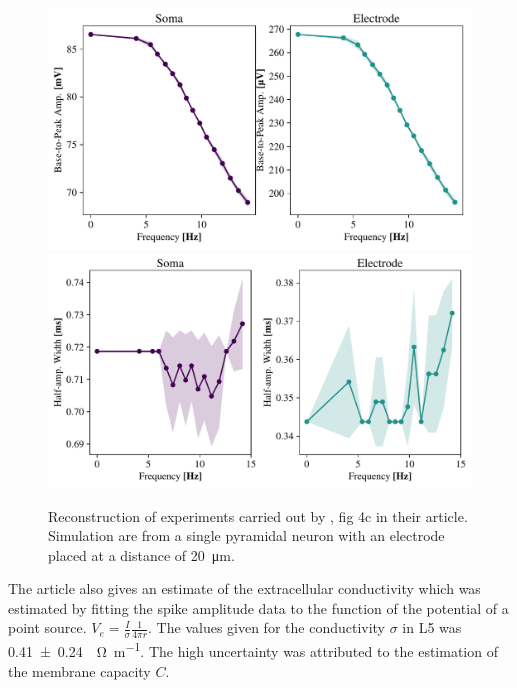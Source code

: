 \documentclass[altfont, fleqn]{uiophd}
\begin{document}
\begin{figure}[h]
    \begin{center}
        \includegraphics[width=\linewidth]{images/sec_4/freq_amp_soma_elec.pdf}
        \includegraphics[width=\linewidth]{images/sec_4/freq_width_soma_elec.pdf}
        \caption{
            Reconstruction of experiments carried out by 
            \textcite{anastassiou_cell_2015}, 
            fig 4c in their article. 
            Simulation are from a single pyramidal neuron with an electrode placed
            at a distance of 
            \SI{20}{\micro\metre}.
        }
        \label{fig:4_width_amp_frequency}
    \end{center}
\end{figure}

The article also gives an estimate of the extracellular conductivity
which was estimated by fitting the spike amplitude data to the 
function of the potential of a point source. 
$V_e = \frac{I}{\sigma} \frac{1}{4 \pi r}$. 
The values given for the conductivity $\sigma$ in L5 was 
\SI[separate-uncertainty = true]{0.41 \pm 0.24}{\per\ohm\per\metre}.
The high uncertainty was attributed to the estimation of 
the membrane capacity $C$.
\newline
\end{document}
